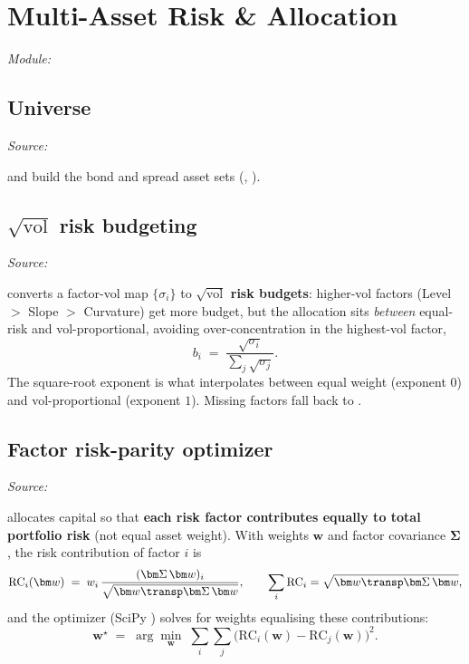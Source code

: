 \chapter{Multi-Asset Risk \& Allocation}
\label{ch:multiasset}
\textit{Module: }

\section{Universe}
\textit{Source: }

 and  build the bond and
spread asset sets (, ).

\section{$\sqrt{\text{vol}}$ risk budgeting}
\textit{Source: }

 converts a factor-vol map $\{\sigma_i\}$ to
\textbf{$\sqrt{\text{vol}}$ risk budgets}: higher-vol factors
(Level $>$ Slope $>$ Curvature) get more budget, but the allocation sits
\emph{between} equal-risk and vol-proportional, avoiding over-concentration in the
highest-vol factor,
\begin{equation}
b_i \;=\; \frac{\sqrt{\sigma_i}}{\sum_{j}\sqrt{\sigma_j}}.
\label{eq:sqrtvol}
\end{equation}
The square-root exponent is what interpolates between equal weight (exponent $0$) and
vol-proportional (exponent $1$). Missing factors fall back to
.

\section{Factor risk-parity optimizer}
\textit{Source: }

 allocates capital so that \textbf{each risk factor
contributes equally to total portfolio risk} (not equal asset weight). With weights
$\bm w$ and factor covariance $\bm\Sigma$, the risk contribution of factor $i$ is
\begin{equation}
\mathrm{RC}_i(\bm w) \;=\; w_i\,\frac{(\bm\Sigma\,\bm w)_i}{\sqrt{\bm w\transp\bm\Sigma\,\bm w}},
\qquad \sum_i \mathrm{RC}_i = \sqrt{\bm w\transp\bm\Sigma\,\bm w},
\label{eq:rc}
\end{equation}
and the optimizer (SciPy ) solves for weights equalising these
contributions:
\begin{equation}
\bm w^\star \;=\; \arg\min_{\bm w}\;
   \sum_{i}\sum_{j}\bigl(\mathrm{RC}_i(\bm w) - \mathrm{RC}_j(\bm w)\bigr)^2.
\label{eq:rp}
\end{equation}

